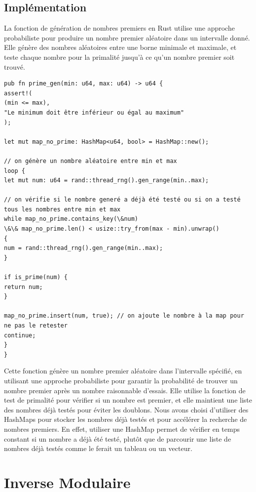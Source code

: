 \documentclass[11pt]{article}
\begin{document}
\subsection{Implémentation}\label{subsec:implementation}

La fonction de génération de nombres premiers en Rust utilise une approche probabiliste pour produire un nombre premier aléatoire dans un intervalle donné.
Elle génère des nombres aléatoires entre une borne minimale et maximale, et teste chaque nombre pour la primalité jusqu'à ce qu'un nombre premier soit trouvé.

\lstset{language=Rust}
\begin{lstlisting}[caption={Fonction de génération de nombres premiers (Rust)}, label={lst:rust_exponential_fast_mod}]
pub fn prime_gen(min: u64, max: u64) -> u64 {
assert!(
(min <= max),
"Le minimum doit être inférieur ou égal au maximum"
);

let mut map_no_prime: HashMap<u64, bool> = HashMap::new();

// on génère un nombre aléatoire entre min et max
loop {
let mut num: u64 = rand::thread_rng().gen_range(min..max);

// on vérifie si le nombre generé a déjà été testé ou si on a testé tous les nombres entre min et max
while map_no_prime.contains_key(\&num)
\&\& map_no_prime.len() < usize::try_from(max - min).unwrap()
{
num = rand::thread_rng().gen_range(min..max);
}

if is_prime(num) {
return num;
}

map_no_prime.insert(num, true); // on ajoute le nombre à la map pour ne pas le retester
continue;
}
}
\end{lstlisting}

Cette fonction génère un nombre premier aléatoire dans l'intervalle spécifié, en utilisant une approche probabiliste pour garantir la probabilité de trouver un nombre premier après un nombre raisonnable d'essais.
Elle utilise la fonction de test de primalité pour vérifier si un nombre est premier, et elle maintient une liste des nombres déjà testés pour éviter les doublons.
Nous avons choisi d'utiliser des HashMaps pour stocker les nombres déjà testés et pour accélérer la recherche de nombres premiers.
En effet, utiliser une HashMap permet de vérifier en temps constant si un nombre a déjà été testé, plutôt que de parcourir une liste de nombres déjà testés comme le ferait un tableau ou un vecteur.


\section{Inverse Modulaire}\label{sec:inverse-modulaire}
\end{document}
